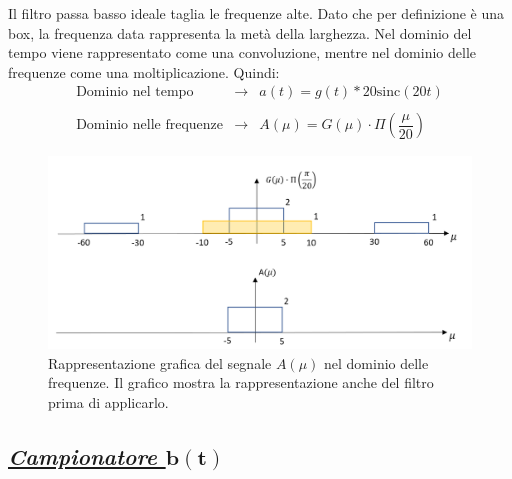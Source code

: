 \documentclass[a4paper]{article}
\begin{document}
	Il filtro passa basso ideale taglia le frequenze alte. Dato che per definizione è una box, la frequenza data rappresenta la metà della larghezza. Nel dominio del tempo viene rappresentato come una convoluzione, mentre nel dominio delle frequenze come una moltiplicazione. Quindi:
	\begin{equation*}
		\begin{array}{lll}
			\text{Dominio nel tempo} & \longrightarrow & a\left(t\right) = g\left(t\right) * 20\mathrm{sinc}\left(20t\right) \\
			\\
			\text{Dominio nelle frequenze} & \longrightarrow & A\left(\mu\right) = G\left(\mu\right) \cdot \Pi\left(\dfrac{\mu}{20}\right)
		\end{array}
	\end{equation*}
	\begin{figure}[!htp]
		\centering
		\includegraphics[width=\textwidth]{img/fig_7.png}
		\caption*{Rappresentazione grafica del segnale $A\left(\mu\right)$ nel dominio delle frequenze. Il grafico mostra la rappresentazione anche del filtro prima di applicarlo.}
	\end{figure}

	\subsection*{\textcolor{Green4}{\underline{\textbf{\emph{Campionatore $\boldsymbol{b\left(t\right)}$}}}}}
	
\end{document}
